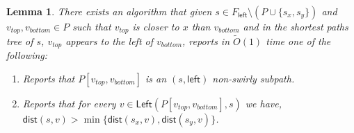 \documentclass{article}
\newcommand{\Left}{\mathsf{Left}}
\newcommand{\leftside}{\mathsf{left}}
\newcommand{\dist}{\mathsf{dist}}
\newtheorem{lemma}{Lemma}
\newcommand{\Otild}{\tilde{O}}
\begin{document}
\begin{lemma}\label{lem:classifyinterval}
    There exists an algorithm that given $s\in F_{\leftside}\setminus (P\cup\{s_x,s_y\})$ and $v_{top},v_{bottom}\in P$ such that $v_{top}$ is closer to $x$ than $v_{bottom}$ and in the shortest paths tree of $s$, $v_{top}$ appears to the left of $v_{bottom}$, reports in $\Otild(1)$ time one of the following:
    \begin{enumerate}
        \item Reports that $P[v_{top},v_{bottom}]$ is an $(s,\leftside)$ non-swirly subpath.
        \item Reports that for every $v\in \Left(P[v_{top},v_{bottom}],s)$ we have, $\dist(s,v)>\min\{\dist(s_x,v),\dist(s_y,v)\}$.
    \end{enumerate}
\end{lemma}
\end{document}
